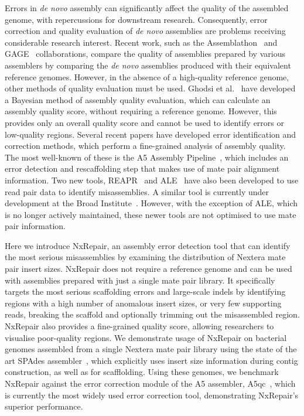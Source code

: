 \documentclass[fleqn,10pt]{wlpeerj}
\begin{document}
Errors in \textit{de novo} assembly can significantly affect the quality of the assembled genome, with repercussions for downstream research. Consequently, error correction and quality evaluation of \textit{de novo} assemblies are problems receiving considerable research interest. Recent work, such as the Assemblathon~\citep{Bradnam2013} and GAGE~\citep{Salzberg2012} collaborations, compare the quality of assemblies prepared by various assemblers by comparing the \textit{de novo} assemblies produced with their equivalent reference genomes. However, in the absence of a high-quality reference genome, other methods of quality evaluation must be used. Ghodsi et al.~\citep{Ghodsi2013} have developed a Bayesian method of assembly quality evaluation, which can calculate an assembly quality score, without requiring a reference genome. However, this provides only an overall quality score and cannot be used to identify errors or low-quality regions. Several recent papers have developed error identification and correction methods, which perform a fine-grained analysis of assembly quality. The most well-known of these is the A5 Assembly Pipeline~\citep{Coil2014, tritt2012}, which includes an error detection and rescaffolding step that makes use of mate pair alignment information. Two new tools, REAPR~\citep{Hunt2013} and ALE~\citep{Clark2013} have also been developed to use read pair data to identify misassemblies. A similar tool is currently under development at the Broad Institute~\citep{pilon2014}. However, with the exception of ALE, which is no longer actively maintained, these newer tools are not optimised to use mate pair information.  

Here we introduce NxRepair, an assembly error detection tool that can identify the most serious misassemblies by examining the distribution of Nextera mate pair insert sizes. NxRepair does not require a reference genome and can be used with assemblies prepared with just a single mate pair library. It specifically targets the most serious scaffolding errors and large-scale indels by identifying regions with a high number of anomalous insert sizes, or very few supporting reads, breaking the scaffold and optionally trimming out the misassembled region. NxRepair also provides a fine-grained quality score, allowing researchers to visualise poor-quality regions. We demonstrate usage of NxRepair on bacterial genomes assembled from a single Nextera mate pair library using the state of the art SPAdes assembler~\citep{Bankevich2012}, which explicitly uses insert size information during contig construction, as well as for scafflolding. Using these genomes, we benchmark NxRepair against the error correction module of the A5 assembler, A5qc~\citep{tritt2012}, which is currently the most widely used error correction tool, demonstrating NxRepair's superior performance.
\end{document}
